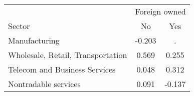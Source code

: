 \begin{tabular}{lcc}
\toprule
 & \multicolumn{2}{c}{Foreign owned} \\
\cmidrule(lr){2-3}
Sector & No & Yes \\
\midrule
Manufacturing & -0.203 & . \\
Wholesale, Retail, Transportation & 0.569 & 0.255 \\
Telecom and Business Services & 0.048 & 0.312 \\
Nontradable services & 0.091 & -0.137 \\
\bottomrule
\end{tabular}
